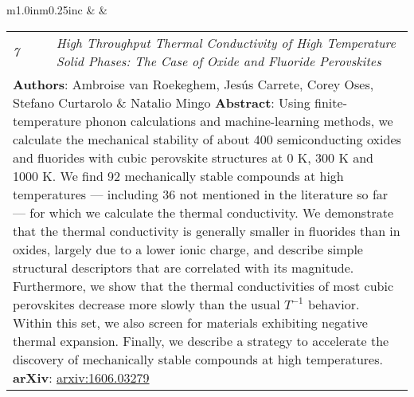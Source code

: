 \documentclass[11pt]{article}
\begin{document}
\begin{tabular}{m{1.0in}m{0.25in}c}
 & & 
\begin{tabular}{m{0.3in}m{0.15in}m{4.3in}}
\textit{\small{7}} & & \textit{High Throughput Thermal Conductivity of High Temperature Solid Phases: The Case of Oxide and Fluoride Perovskites} \\ \multicolumn{3}{p{4.75in}}{\footnotesize{\textbf{Authors}: Ambroise van Roekeghem, Jes\'{u}s Carrete, \textcolor{NavyBlue}{Corey Oses}, Stefano Curtarolo \& Natalio Mingo \newline \textbf{Abstract}: Using finite-temperature phonon calculations and machine-learning methods, we calculate the mechanical stability of about 400 semiconducting oxides and fluorides with cubic perovskite structures at 0 K, 300 K and 1000 K. We find 92 mechanically stable compounds at high temperatures --- including 36 not mentioned in the literature so far --- for which we calculate the thermal conductivity. We demonstrate that the thermal conductivity is generally smaller in fluorides than in oxides, largely due to a lower ionic charge, and describe simple structural descriptors that are correlated with its magnitude. Furthermore, we show that the thermal conductivities of most cubic perovskites decrease more slowly than the usual $T^{-1}$ behavior. Within this set, we also screen for materials exhibiting negative thermal expansion. Finally, we describe a strategy to accelerate the discovery of mechanically stable compounds at high temperatures. \newline \textbf{arXiv}: \href{http://arxiv.org/abs/1606.03279}{arxiv:1606.03279}}} 
\end{tabular} \\ 
\end{tabular}

\vspace{0.25cm}
\end{document}
